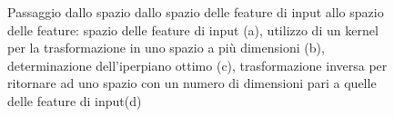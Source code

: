 \documentclass[oneside, openany]{book}
\begin{document}
		\begin{figure}[h]
		\centering
		 \quad
		 \quad
		 \quad
		 \quad
		\caption{Passaggio dallo spazio dallo spazio delle feature di input allo spazio delle feature: spazio delle feature di input (a), utilizzo di un kernel per la trasformazione in uno spazio a più dimensioni (b), determinazione dell'iperpiano ottimo (c), trasformazione inversa per ritornare ad uno spazio con un numero di dimensioni pari a quelle delle feature di input(d)}
		\label{fig:hyp}
	\end{figure}	
\end{document}
